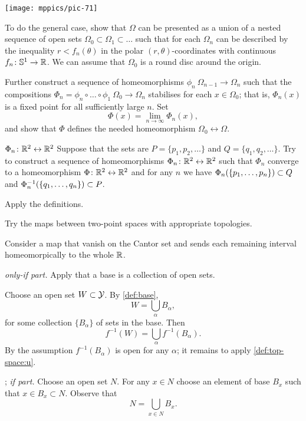 \begin{multicols}{2}
\begin{Figure}
\vskip-0mm
\centering
\texttt{[image: mppics/pic-71]}
\end{Figure}

To do the general case,
show that $\Omega$ can be presented as a union of a nested sequence of open sets $\Omega_0\subset \Omega_1\subset \dots$
such that for each $\Omega_n$ can be described by the inequality $r<f_n(\theta)$ in the polar $(r,\theta)$-coordinates with continuous $f_n\colon\mathbb{S}^1\to \mathbb{R}$.
We can assume that $\Omega_0$ is a round disc around the origin.

Further construct a sequence of homeomorphisms $\phi_n\:\Omega_{n-1}\to\Omega_{n}$ such that 
the compositions $\Phi_n=\phi_n\circ\dots\circ\phi_1\:\Omega_0\to \Omega_n$ stabilises for each $x\in\Omega_0$; that is, $\Phi_n(x)$ is a fixed point for all sufficiently large $n$.
Set 
\[\Phi(x)=\lim_{n\to\infty} \Phi_n(x),\]
and show that $\Phi$ defines the needed homeomorphism $\Omega_0\leftrightarrow \Omega$.

$\Phi_n\colon\mathbb{R}^2\leftrightarrow\mathbb{R}^2$
Suppose that the sets are $P=\{p_1,p_2,\dots \}$ and $Q=\{q_1,q_2,\dots\}$.
Try to construct a sequence of homeomorphisms $\Phi_n\colon\mathbb{R}^2\leftrightarrow\mathbb{R}^2$ such that 
$\Phi_n$ converge to a homeomorphism $\Phi\colon\mathbb{R}^2\leftrightarrow\mathbb{R}^2$ and for any $n$ we have $\Phi_n(\{p_1,\dots,p_n\})\z\subset Q$ and $\Phi_n^{-1}(\{q_1,\dots,q_n\})\z\subset P$.

Apply the definitions.

Try the maps between two-point spaces with appropriate topologies.

Consider a map that vanish on the Cantor set and sends each remaining interval homeomorpically to the whole $\mathbb{R}$.

\parbf{\ref{ex:base};} \textit{only-if part.}
Apply that a base is a collection of open sets.

Choose an open set $W\subset\mathcal{Y}$.
By \ref{def:base}, 
\[W=\bigcup_\alpha B_\alpha,\]
for some collection $\{B_\alpha\}$ of sets in the base.
Then 
\[f^{-1}(W)=\bigcup_\alpha f^{-1}(B_\alpha).\]
By the assumption $f^{-1}(B_\alpha)$ is open for any $\alpha$;
it remains to apply \ref{def:top-space:u}.

\parbf{\ref{ex:base-nbhd}}; \textit{if part.} 
Choose an open set $N$.
For any $x\in N$ choose an element of base $B_x$ such that $x\in B_x\subset N$.
Observe that 
\[N=\bigcup_{x\in N}B_x.\]


\end{multicols}
